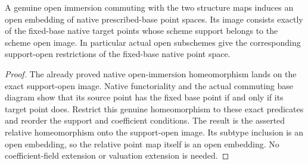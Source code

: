 \begin{theorem}
\label{scheme:relative-open-embedding}
\leanok
{}
A genuine open immersion commuting with the two structure maps induces an open
embedding of native prescribed-base point spaces. Its image consists exactly
of the fixed-base native target points whose scheme support belongs to the
scheme open image. In particular actual open subschemes give the corresponding
support-open restrictions of the fixed-base native point space.
\end{theorem}
\begin{proof}
The already proved native open-immersion homeomorphism lands on the exact
support-open image. Native functoriality and the actual commuting base diagram
show that its source point has the fixed base point if and only if its target
point does. Restrict this genuine homeomorphism to these exact predicates and
reorder the support and coefficient conditions. The result is the asserted
relative homeomorphism onto the support-open image. Its subtype inclusion is
an open embedding, so the relative point map itself is an open embedding.
No coefficient-field extension or valuation extension is needed.
\end{proof}

